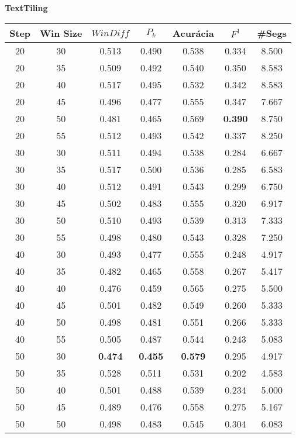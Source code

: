 
\center
\textbf{TextTiling}  
\begin{longtable}[c]{|c|c|c|c|c|c|c|} 
\hline 
 Step & Win Size & $WinDiff$ & $P_k$ & Acurácia & $F^1$ & \#Segs\\ \hline 
 20 & 30 & 0.513 & 0.490 & 0.538 & 0.334 & 8.500  \\ \hline 
 20 & 35 & 0.509 & 0.492 & 0.540 & 0.350 & 8.583  \\ \hline 
 20 & 40 & 0.517 & 0.495 & 0.532 & 0.342 & 8.583  \\ \hline 
 20 & 45 & 0.496 & 0.477 & 0.555 & 0.347 & 7.667  \\ \hline 
 20 & 50 & 0.481 & 0.465 & 0.569 & \cellcolor{gray!20} \textbf{0.390} & 8.750  \\ \hline 
 20 & 55 & 0.512 & 0.493 & 0.542 & 0.337 & 8.250  \\ \hline 
 30 & 30 & 0.511 & 0.494 & 0.538 & 0.284 & 6.667  \\ \hline 
 30 & 35 & 0.517 & 0.500 & 0.536 & 0.285 & 6.583  \\ \hline 
 30 & 40 & 0.512 & 0.491 & 0.543 & 0.299 & 6.750  \\ \hline 
 30 & 45 & 0.502 & 0.483 & 0.555 & 0.320 & 6.917  \\ \hline 
 30 & 50 & 0.510 & 0.493 & 0.539 & 0.313 & 7.333  \\ \hline 
 30 & 55 & 0.498 & 0.480 & 0.543 & 0.328 & 7.250  \\ \hline 
 40 & 30 & 0.493 & 0.477 & 0.555 & 0.248 & 4.917  \\ \hline 
 40 & 35 & 0.482 & 0.465 & 0.558 & 0.267 & 5.417  \\ \hline 
 40 & 40 & 0.476 & 0.459 & 0.565 & 0.275 & 5.500  \\ \hline 
 40 & 45 & 0.501 & 0.482 & 0.549 & 0.260 & 5.333  \\ \hline 
 40 & 50 & 0.498 & 0.481 & 0.551 & 0.266 & 5.333  \\ \hline 
 40 & 55 & 0.505 & 0.487 & 0.544 & 0.243 & 5.083  \\ \hline 
 50 & 30 & \cellcolor{gray!20} \textbf{0.474} & \cellcolor{gray!20} \textbf{0.455} & \cellcolor{gray!20} \textbf{0.579} & 0.295 & 4.917  \\ \hline 
 50 & 35 & 0.528 & 0.511 & 0.531 & 0.202 & 4.583  \\ \hline 
 50 & 40 & 0.501 & 0.488 & 0.539 & 0.234 & 5.000  \\ \hline 
 50 & 45 & 0.489 & 0.476 & 0.558 & 0.275 & 5.167  \\ \hline 
 50 & 50 & 0.498 & 0.483 & 0.545 & 0.304 & 6.083  \\ \hline 

\end{longtable}
